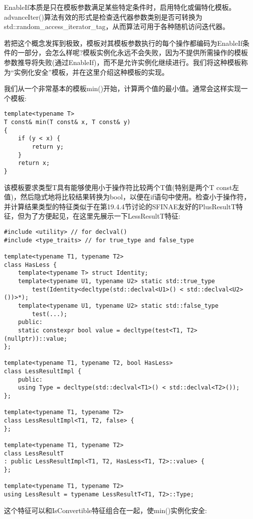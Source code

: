 EnableIf本质是只在模板参数满足某些特定条件时，启用特化或偏特化模板。advanceIter()算法有效的形式是检查迭代器参数类别是否可转换为std::random\_access\_iterator\_tag，从而算法可用于各种随机访问迭代器。

若把这个概念发挥到极致，模板对其模板参数执行的每个操作都编码为EnableIf条件的一部分，会怎么样呢?模板实例化永远不会失败，因为不提供所需操作的模板参数推导将失败(通过EnableIf)，而不是允许实例化继续进行。我们将这种模板称为“实例化安全”模板，并在这里介绍这种模板的实现。

我们从一个非常基本的模板min()开始，计算两个值的最小值。通常会这样实现一个模板:

\begin{lstlisting}[style=styleCXX]
template<typename T>
T const& min(T const& x, T const& y)
{
	if (y < x) {
		return y;
	}
	return x;
}
\end{lstlisting}

该模板要求类型T具有能够使用小于操作符比较两个T值(特别是两个T const左值)，然后隐式地将比较结果转换为bool，以便在if语句中使用。检查小于操作符，并计算结果类型的特征类似于在第19.4.4节讨论的SFINAE友好的PlusResultT特征，但为了方便起见，在这里先展示一下LessResultT特征:

\begin{lstlisting}[style=styleCXX]
#include <utility> // for declval()
#include <type_traits> // for true_type and false_type

template<typename T1, typename T2>
class HasLess {
	template<typename T> struct Identity;
	template<typename U1, typename U2> static std::true_type
		test(Identity<decltype(std::declval<U1>() < std::declval<U2>())>*);
	template<typename U1, typename U2> static std::false_type
		test(...);
	public:
	static constexpr bool value = decltype(test<T1, T2>(nullptr))::value;
};

template<typename T1, typename T2, bool HasLess>
class LessResultImpl {
	public:
	using Type = decltype(std::declval<T1>() < std::declval<T2>());
};

template<typename T1, typename T2>
class LessResultImpl<T1, T2, false> {
};

template<typename T1, typename T2>
class LessResultT
: public LessResultImpl<T1, T2, HasLess<T1, T2>::value> {
};

template<typename T1, typename T2>
using LessResult = typename LessResultT<T1, T2>::Type;
\end{lstlisting}

这个特征可以和IsConvertible特征组合在一起，使min()实例化安全:


